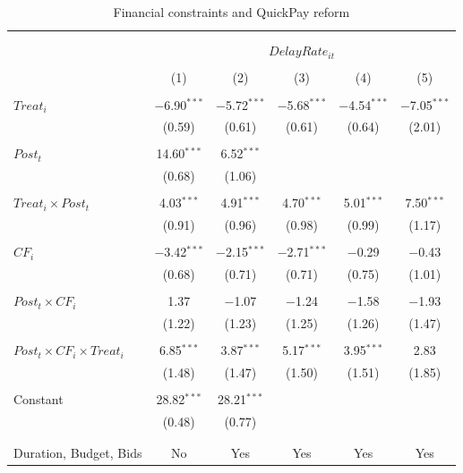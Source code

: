 \documentclass[
]{article}
\begin{document}
\begin{table}[H] \centering 
  \caption{Financial constraints and QuickPay reform} 
  \label{} 
\small 
\begin{tabular}{@{\extracolsep{-2pt}}lccccc} 
\\[-1.8ex]\hline 
\hline \\[-1.8ex] 
\\[-1.8ex] & \multicolumn{5}{c}{$DelayRate_{it}$  } \\ 
\\[-1.8ex] & (1) & (2) & (3) & (4) & (5)\\ 
\hline \\[-1.8ex] 
 $Treat_i$ & $-$6.90$^{***}$ & $-$5.72$^{***}$ & $-$5.68$^{***}$ & $-$4.54$^{***}$ & $-$7.05$^{***}$ \\ 
  & (0.59) & (0.61) & (0.61) & (0.64) & (2.01) \\ 
  & & & & & \\ 
 $Post_t$ & 14.60$^{***}$ & 6.52$^{***}$ &  &  &  \\ 
  & (0.68) & (1.06) &  &  &  \\ 
  & & & & & \\ 
 $Treat_i \times Post_t$ & 4.03$^{***}$ & 4.91$^{***}$ & 4.70$^{***}$ & 5.01$^{***}$ & 7.50$^{***}$ \\ 
  & (0.91) & (0.96) & (0.98) & (0.99) & (1.17) \\ 
  & & & & & \\ 
 $CF_i$ & $-$3.42$^{***}$ & $-$2.15$^{***}$ & $-$2.71$^{***}$ & $-$0.29 & $-$0.43 \\ 
  & (0.68) & (0.71) & (0.71) & (0.75) & (1.01) \\ 
  & & & & & \\ 
 $Post_t \times CF_i$ & 1.37 & $-$1.07 & $-$1.24 & $-$1.58 & $-$1.93 \\ 
  & (1.22) & (1.23) & (1.25) & (1.26) & (1.47) \\ 
  & & & & & \\ 
 $Post_t \times CF_i \times Treat_i$ & 6.85$^{***}$ & 3.87$^{***}$ & 5.17$^{***}$ & 3.95$^{***}$ & 2.83 \\ 
  & (1.48) & (1.47) & (1.50) & (1.51) & (1.85) \\ 
  & & & & & \\ 
 Constant & 28.82$^{***}$ & 28.21$^{***}$ &  &  &  \\ 
  & (0.48) & (0.77) &  &  &  \\ 
  & & & & & \\ 
\hline \\[-1.8ex] 
Duration, Budget, Bids & No & Yes & Yes & Yes & Yes \\ 

\end{tabular}
\end{table}
\end{document}
